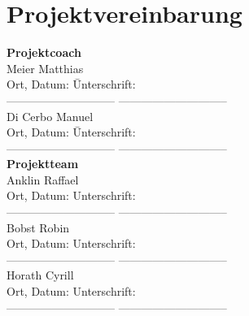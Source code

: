 \clearpage
\section{Projektvereinbarung}\label{sec:Projektvereinbarung}
	\begin{tabbing}
		\textbf{Projektcoach}\\[0.2cm]
		Meier Matthias\\[0.2cm]
		Ort, Datum: \hspace{5cm}\=Unterschrift:
		\\[0.5cm]----------------------------- \>-----------------------------
		\\[0.2cm]
		Di Cerbo Manuel\\[0.2cm]
		Ort, Datum: \hspace{5cm}\=Unterschrift:
		\\[0.5cm]----------------------------- \>-----------------------------
		\\[1cm]
		\textbf{Projektteam}\\[0.2cm]
		Anklin Raffael\\[0.2cm]
		Ort, Datum: \>Unterschrift:
		\\[0.5cm]----------------------------- \>-----------------------------
		\\[0.2cm]
		Bobst Robin\\[0.2cm]
		Ort, Datum: \>Unterschrift:
		\\[0.5cm]----------------------------- \>-----------------------------
		\\[0.2cm]
		Horath Cyrill\\[0.2cm]
		Ort, Datum: \>Unterschrift:
		\\[0.5cm]----------------------------- \>-----------------------------
	\end{tabbing}
	
	\clearpage



